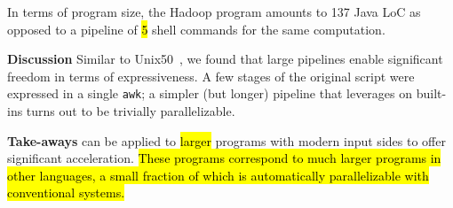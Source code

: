 \documentclass[letterpaper,twocolumn,10pt]{article}
\newcommand{\heading}[1]{\vspace{4pt}\noindent\textbf{#1}\enspace}
\newcommand{\ttt}[1]{\texttt{#1}}
\newcommand{\todo}[1]{\hl{#1}\xspace}
\newcommand{\nv}[1]{[{\color{cyan}nv: #1}]}
\newcommand{\kk}[1]{[{\color{magenta}kk: #1}]}
\begin{document}
In terms of program size, the Hadoop program amounts to 137 Java LoC as opposed to a pipeline of \todo{5} shell commands for the same computation.





\heading{Discussion}
Similar to Unix50~, we found that large pipelines enable significant freedom in terms of expressiveness.
A few stages of the original script were expressed in a single \ttt{awk};
  a simpler (but longer) pipeline that leverages on \unix built-ins %
  turns out to be trivially parallelizable.




\heading{Take-aways}
\sys can be applied to \todo{larger} %
  programs with modern input sides to offer significant acceleration.
\todo{These programs correspond to much larger programs in other languages, a small fraction of which is automatically parallelizable with conventional systems.}
\end{document}
